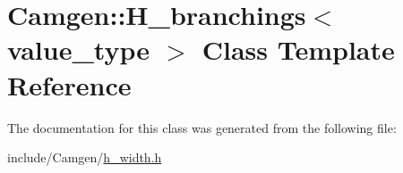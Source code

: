 \hypertarget{a00257}{}\section{Camgen\+:\+:H\+\_\+branchings$<$ value\+\_\+type $>$ Class Template Reference}
\label{a00257}


The documentation for this class was generated from the following file\+:\begin{DoxyCompactItemize}
\item 
include/\+Camgen/\hyperlink{a00656}{h\+\_\+width.\+h}\end{DoxyCompactItemize}
